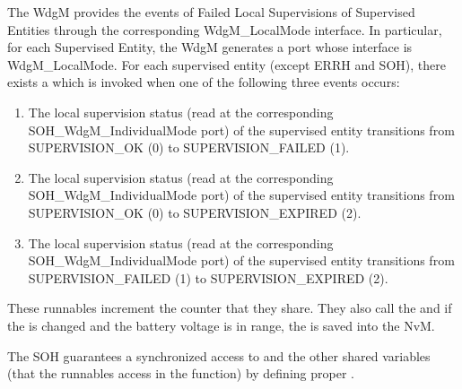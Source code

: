 {
The WdgM provides the events of Failed Local Supervisions of Supervised Entities through the corresponding WdgM\_LocalMode interface.
In particular, for each Supervised Entity, the WdgM generates a port whose interface is WdgM\_LocalMode.\newline
For each supervised entity (except ERRH and SOH), there exists a \textbf{} which is invoked when one of the following three events occurs:
\begin{enumerate}
\item The local supervision status (read at the corresponding SOH\_WdgM\_IndividualMode port) of the supervised entity transitions from SUPERVISION\_OK (0) to SUPERVISION\_FAILED (1).
\item The local supervision status (read at the corresponding SOH\_WdgM\_IndividualMode port) of the supervised entity transitions from SUPERVISION\_OK (0) to SUPERVISION\_EXPIRED (2).
\item The local supervision status (read at the corresponding SOH\_WdgM\_IndividualMode port) of the supervised entity transitions from SUPERVISION\_FAILED (1) to SUPERVISION\_EXPIRED (2).
\end{enumerate}

These runnables increment the counter  that they share. They also call the  and if the  is changed and the battery voltage is in range, the  is saved into the NvM.

The SOH guarantees a synchronized access to  and the other shared variables (that the runnables access in the  function)  by defining proper .
}
{
         
}

